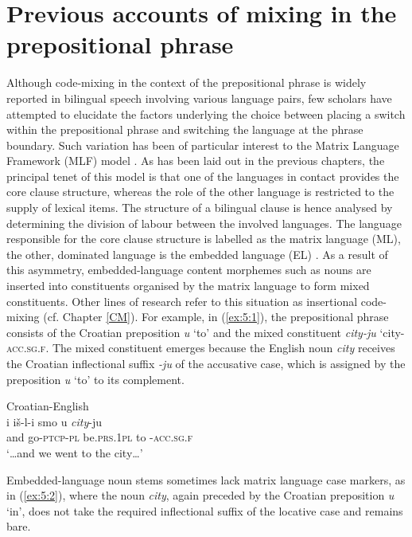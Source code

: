 \section{Previous accounts of mixing in the prepositional phrase}
Although code-mixing in the context of the prepositional phrase is widely reported in bilingual speech involving various language pairs, few scholars have attempted to elucidate the factors underlying the choice between placing a switch within the prepositional phrase and switching the language at the phrase boundary. Such variation has been of particular interest to the Matrix Language Framework (MLF) model \citep{myers-scotton-duelling-1993,myers-scotton-contact-2002}. As has been laid out in the previous chapters, the principal tenet of this model is that one of the languages in contact provides the core clause structure, whereas the role of the other language is restricted to the supply of lexical items. The structure of a bilingual clause is hence analysed by determining the division of labour between the involved languages. The language responsible for the core clause structure is labelled as the matrix language (ML), the other, dominated language is the embedded language (EL) \citep[75--119]{myers-scotton-duelling-1993}. As a result of this asymmetry, embedded-language content morphemes such as nouns are inserted into constituents organised by the matrix language to form mixed constituents. Other lines of research refer to this situation as insertional code-mixing (cf. Chapter \ref{CM}). For example, in (\ref{ex:5:1}), the prepositional phrase consists of the Croatian preposition \textit{u} `to' and the mixed constituent \textit{city-ju} `city-\textsc{acc.sg.f}. The mixed constituent emerges because the English noun \textit{city} receives the Croatian inflectional suffix \textit{-ju} of the accusative case, which is assigned by the preposition \textit{u} `to' to its complement.
	
\ea
\label{ex:5:1}
Croatian-English \citep[203]{hlavac-second-generation-2003}\\
\gll i {iš-l-i} {smo} {u} {\textit{city}-{ju}}\\ 
	{and} go-\textsc{ptcp-pl} be.\textsc{prs.1pl} to {}-\textsc{acc.sg.f}\\
\glt `\dots{}and we went to the city\dots' 
\z

\noindent Embedded-language noun stems sometimes lack matrix language case markers, as in (\ref{ex:5:2}), where the noun \textit{city}, again preceded by the Croatian preposition \textit{u} `in', does not take the required inflectional suffix of the locative case and remains bare.

